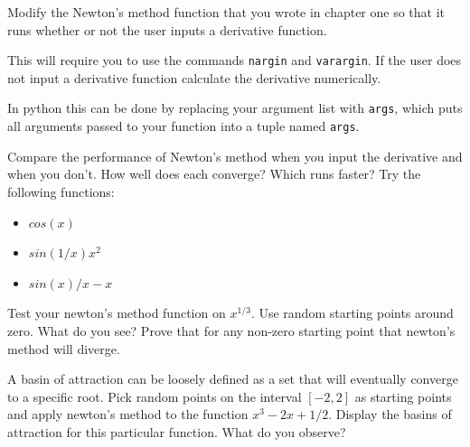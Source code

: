 \begin{problem}
Modify the Newton's method function that you wrote in chapter one so that it runs whether or not the user inputs a derivative function. \begin{matlab}This will require you to use the commands {\tt nargin} and {\tt varargin}. If the user does not input a derivative function calculate the derivative numerically.\end{matlab}\begin{python}In python this can be done by replacing your argument list with {\tt *args}, which puts all arguments passed to your function into a tuple named {\tt args}.\end{python}

Compare the performance of Newton's method when you input the derivative and when you don't. How well does each converge? Which runs faster? Try the following functions:

\begin{itemize}
\item $cos(x)$
\item $sin(1/x)x^2$
\item $sin(x)/x -x$
\end{itemize}



\end{problem}

\begin{problem}
Test your newton's method function on $x^{1/3}$. Use random starting points around zero. What do you see? Prove that for any non-zero starting point that newton's method will diverge.
\end{problem}

\begin{problem}
A basin of attraction can be loosely defined as a set that will eventually converge to a specific root. Pick random points on the interval $[-2,2]$ as starting points and apply newton's method to the function $x^3 -2x + 1/2$. Display the basins of attraction for this particular function. What do you observe?


\end{problem}

